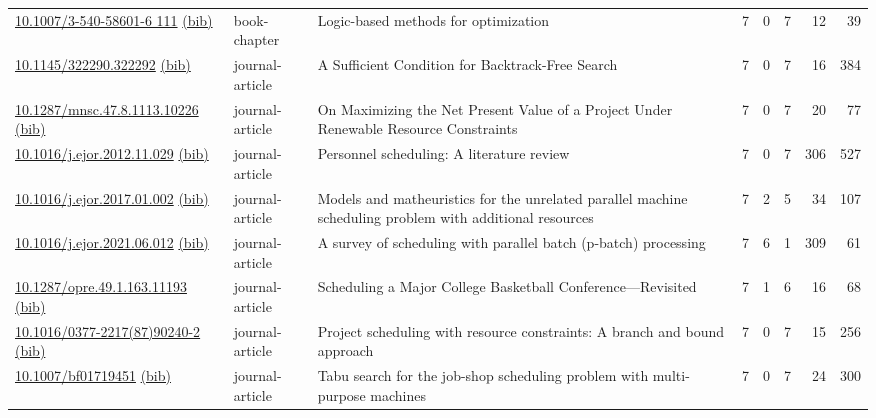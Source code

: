 {\begin{longtable}{p{5cm}lp{11cm}rrrrr}
\href{http://dx.doi.org/10.1007/3-540-58601-6_111}{10.1007/3-540-58601-6 111} \href{https://www.doi2bib.org/bib/10.1007/3-540-58601-6_111}{(bib)} & book-chapter & Logic-based methods for optimization & 7 & 0 & 7 & 12 & 39 \\
\href{http://dx.doi.org/10.1145/322290.322292}{10.1145/322290.322292} \href{https://www.doi2bib.org/bib/10.1145/322290.322292}{(bib)} & journal-article & A Sufficient Condition for Backtrack-Free Search & 7 & 0 & 7 & 16 & 384 \\
\href{http://dx.doi.org/10.1287/mnsc.47.8.1113.10226}{10.1287/mnsc.47.8.1113.10226} \href{https://www.doi2bib.org/bib/10.1287/mnsc.47.8.1113.10226}{(bib)} & journal-article & On Maximizing the Net Present Value of a Project Under Renewable Resource Constraints & 7 & 0 & 7 & 20 & 77 \\
\href{http://dx.doi.org/10.1016/j.ejor.2012.11.029}{10.1016/j.ejor.2012.11.029} \href{https://www.doi2bib.org/bib/10.1016/j.ejor.2012.11.029}{(bib)} & journal-article & Personnel scheduling: A literature review & 7 & 0 & 7 & 306 & 527 \\
\href{http://dx.doi.org/10.1016/j.ejor.2017.01.002}{10.1016/j.ejor.2017.01.002} \href{https://www.doi2bib.org/bib/10.1016/j.ejor.2017.01.002}{(bib)} & journal-article & Models and matheuristics for the unrelated parallel machine scheduling problem with additional resources & 7 & 2 & 5 & 34 & 107 \\
\href{http://dx.doi.org/10.1016/j.ejor.2021.06.012}{10.1016/j.ejor.2021.06.012} \href{https://www.doi2bib.org/bib/10.1016/j.ejor.2021.06.012}{(bib)} & journal-article & A survey of scheduling with parallel batch (p-batch) processing & 7 & 6 & 1 & 309 & 61 \\
\href{http://dx.doi.org/10.1287/opre.49.1.163.11193}{10.1287/opre.49.1.163.11193} \href{https://www.doi2bib.org/bib/10.1287/opre.49.1.163.11193}{(bib)} & journal-article & Scheduling a Major College Basketball Conference—Revisited & 7 & 1 & 6 & 16 & 68 \\
\href{http://dx.doi.org/10.1016/0377-2217(87)90240-2}{10.1016/0377-2217(87)90240-2} \href{https://www.doi2bib.org/bib/10.1016/0377-2217(87)90240-2}{(bib)} & journal-article & Project scheduling with resource constraints: A branch and bound approach & 7 & 0 & 7 & 15 & 256 \\
\href{http://dx.doi.org/10.1007/bf01719451}{10.1007/bf01719451} \href{https://www.doi2bib.org/bib/10.1007/bf01719451}{(bib)} & journal-article & Tabu search for the job-shop scheduling problem with multi-purpose machines & 7 & 0 & 7 & 24 & 300 \\

\end{longtable}}
